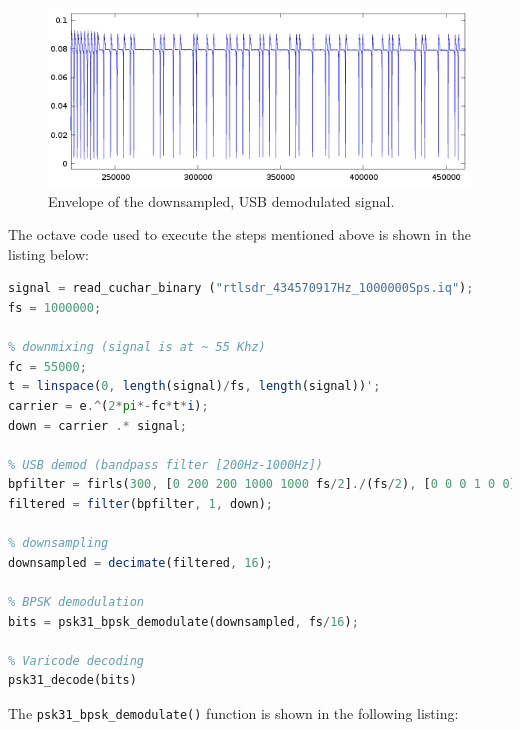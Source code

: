\begin{figure}
	\centering
	\includegraphics[width=1\linewidth]{gfx/psk31/psk31_envelope.png}
	\caption{Envelope of the downsampled, USB demodulated signal.}
	\label{fig:psk31_envelope}
\end{figure}

The octave code used to execute the steps mentioned above is shown in the
listing below:

\begin{lstlisting}[label=lst:octave_psk31, caption=Octave implementation of the PSK31 demodulator, language=octave]
% load signal
signal = read_cuchar_binary ("rtlsdr_434570917Hz_1000000Sps.iq");
fs = 1000000;

% downmixing (signal is at ~ 55 Khz)
fc = 55000;
t = linspace(0, length(signal)/fs, length(signal))';
carrier = e.^(2*pi*-fc*t*i);
down = carrier .* signal;

% USB demod (bandpass filter [200Hz-1000Hz])
bpfilter = firls(300, [0 200 200 1000 1000 fs/2]./(fs/2), [0 0 0 1 0 0]);
filtered = filter(bpfilter, 1, down);

% downsampling
downsampled = decimate(filtered, 16);

% BPSK demodulation
bits = psk31_bpsk_demodulate(downsampled, fs/16);

% Varicode decoding
psk31_decode(bits)
\end{lstlisting}

The \texttt{psk31\_bpsk\_demodulate()} function is shown in the following listing:

